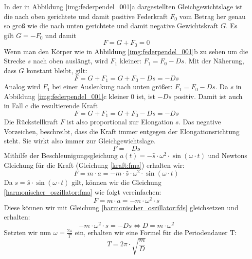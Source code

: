 \documentclass[a4paper]{article}
\begin{document}
	
			In der in Abbildung \ref{img:federpendel_001}a dargestellten Gleichgewichtslage ist die nach oben gerichtete und damit positive Federkraft $F_0$ vom Betrag her genau so groß wie die nach unten gerichtete und damit negative Gewichtskraft $G$. Es gilt $G=-F_0$ und damit
			\begin{equation}
				F=G+F_0=0
			\end{equation}
			Wenn man den Körper wie in Abbildung \ref{img:federpendel_001}b zu sehen um die Strecke $s$ nach oben auslängt, wird $F_1$ kleiner: $F_1 = F_0-Ds$. Mit der Näherung, dass $G$ konstant bleibt, gilt:
			\begin{equation}
				F=G+F_1= G+F_0-Ds = -Ds
			\end{equation}
			Analog wird $F_1$ bei einer Auslenkung nach unten größer: $F_1 = F_0-Ds$. Da $s$ in Abbildung \ref{img:federpendel_001}c kleiner $0$ ist, ist $-Ds$ positiv. Damit ist auch in Fall c die resultierende Kraft
			\begin{equation}\label{harmonischer_oszillator:fds}
			F=G+F_1= G+F_0-Ds = -Ds
			\end{equation}
			Die Rückstellkraft $F$ ist also proportional zur Elongation $s$. Das negative Vorzeichen, beschreibt, dass die Kraft immer entgegen der Elongationsrichtung steht. Sie wirkt also immer zur Gleichgewichtslage.
			\begin{equation}
				F= -Ds
			\end{equation}
			Mithilfe der Beschleunigungsgleichung $a(t)=-\hat{s}\cdot\omega^2\cdot\sin\left(\omega\cdot t\right)$ und Newtons Gleichung für die Kraft (Gleichung \ref{kraft:fma}) erhalten wir:
			\begin{equation}\label{harmonischer_oszillator:fma}
				F= m\cdot a = -m\cdot \hat{s}\cdot\omega^2\cdot\sin\left(\omega\cdot t\right)
			\end{equation}
			Da $s=\hat{s} \cdot\sin(\omega\cdot t)$ gilt, können wir die Gleichung \ref{harmonischer_oszillator:fma} wie folgt vereinfachen:
			\begin{equation}
				F= m\cdot a = -m\cdot\omega^2\cdot s
			\end{equation}
			Diese können wir mit Gleichung \ref{harmonischer_oszillator:fds} gleichsetzen und erhalten:
			\begin{equation}
				-m\cdot\omega^2\cdot s = -Ds \Leftrightarrow D=m\cdot\omega^2
			\end{equation}
			Setzten wir nun $\omega=\frac{2\pi}{T}$ ein, erhalten wir eine Formel für die Periodendauer T:
			\begin{equation}
				T=2\pi\cdot\sqrt{\frac{m}{D}}
			\end{equation}
	
\end{document}
